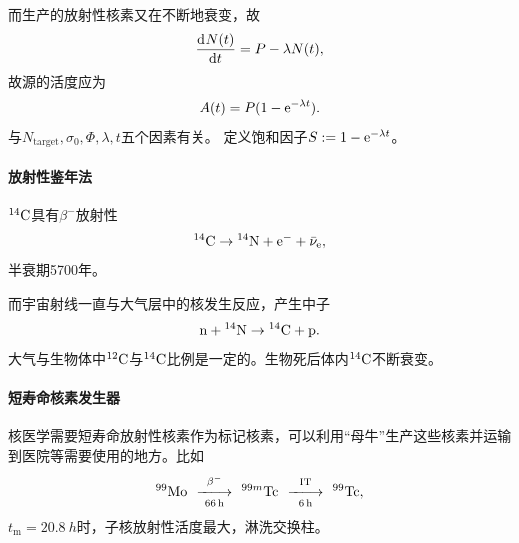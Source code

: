 而生产的放射性核素又在不断地衰变，故
\[
	\frac{\mathrm{d}^{{}}N(t)}{\mathrm{d}{t}^{{}}}=P-\lambda N(t),
\]
故源的活度应为
\begin{align}
	A(t)=P(1-\mathop{}\!\mathrm{e}^{-\lambda t}).
\end{align}
与$N_{\mathrm{target}},\sigma_0,\Phi,\lambda,t$五个因素有关。
定义饱和因子$S:=1-\mathop{}\!\mathrm{e}^{-\lambda t}$。
\paragraph{放射性鉴年法}${^{14}\mathrm{C}}$具有$\beta^-$放射性
\[
	{^{14}\mathrm{C}}\to{^{14}\mathrm{N}}+\mathrm e^-+\bar\nu_\mathrm e,
\]
半衰期5700年。

而宇宙射线一直与大气层中的核发生反应，产生中子
\[
	\mathrm n+{^{14}\mathrm{N}}\to{^{14}\mathrm{C}}+\mathrm p.
\]
大气与生物体中${^{12}\mathrm{C}}$与${^{14}\mathrm{C}}$比例是一定的。生物死后体内${^{14}\mathrm{C}}$不断衰变。
\paragraph{短寿命核素发生器}
核医学需要短寿命放射性核素作为标记核素，可以利用“母牛”生产这些核素并运输到医院等需要使用的地方。比如
\[
	{^{99}\mathrm{Mo}}\enspace\mathop{-\hspace{-4pt}-\hspace{-5pt}\longrightarrow}\limits^{\beta^-}_{\SI{66}{h}}\enspace{^{99m}\mathrm{Tc}}\enspace\mathop{-\hspace{-4pt}-\hspace{-5pt}\longrightarrow}\limits^{\mathrm{IT}}_{\SI{6}{h}}\enspace{^{99}\mathrm{Tc}},
\]
$t_\mathrm m=\SI{20.8}{h}$时，子核放射性活度最大，淋洗交换柱。

